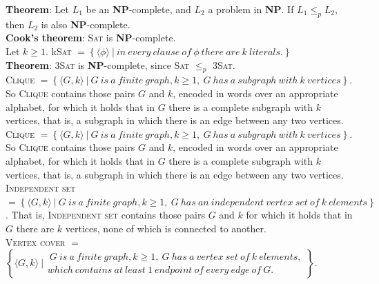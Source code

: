 \documentclass[margin=0px]{article}
\begin{document}
\noindent \textbf{Theorem}: Let $L_{1}$ be an \textbf{NP}-complete, and $L_{2}$ a problem in \textbf{NP}.
If $L_{1} \leq_{p} L_{2}$, then $L_{2}$ is also \textbf{NP}-complete.\\

\noindent \textbf{Cook's theorem}: \textsc{Sat} is \textbf{NP}-complete.\\

\noindent Let $k \geq 1$.
k\textsc{Sat} $= \left\{\langle \phi \rangle \ | \ in \ every \ clause \ of \ \phi \ there \ are \ k \ literals. \right\}$\\

\noindent \textbf{Theorem}: 3\textsc{Sat} is \textbf{NP}-complete, since \textsc{Sat} $\leq_{p}$ 3\textsc{Sat}.\\

\noindent \textsc{Clique} $= \left\{\langle G, k \rangle \ | \ G \ is \ a \ finite \ graph, k \geq 1, \ G \ has \ a \ subgraph \ with \ k
    \ vertices  \right\}$.
So \textsc{Clique} contains those pairs $G$ and $k$, encoded in words over an appropriate alphabet,
for which it holds that in $G$ there is a complete subgraph with $k$ vertices,
that is, a subgraph in which there is an edge between any two vertices.\\

\noindent \textsc{Clique} $= \left\{\langle G, k \rangle \ | \ G \ is \ a \ finite \ graph, k \geq 1, \ G \ has \ a \ subgraph \ with \ k
    \ vertices  \right\}$.
So \textsc{Clique} contains those pairs $G$ and $k$, encoded in words over an appropriate alphabet,
for which it holds that in $G$ there is a complete subgraph with $k$ vertices,
that is, a subgraph in which there is an edge between any two vertices.\\

\noindent \textsc{Independent set} $= \left\{\langle G, k \rangle \ | \ G \ is \ a \ finite \ graph, k \geq 1, \ G \ has \ an \ independent \ vertex \ set \ of \ k \ elements  \right\}$.
That is, \textsc{Independent set} contains those pairs $G$ and $k$ for which
it holds that in $G$ there are $k$ vertices, none of which is connected to
another.\\

\noindent \textsc{Vertex cover} $=$\\
$\left\{\langle G, k \rangle \ | \begin{array}{lr}
        \ G \ is \ a \ finite \ graph, k \geq 1, \ G \ has \ a \ vertex \ set \ of \ k \ elements, \\
        which \ contains \ at \ least \ 1 \ endpoint \ of \ every \ edge \ of \ G.
    \end{array}
    \right\}$.\\
\end{document}
